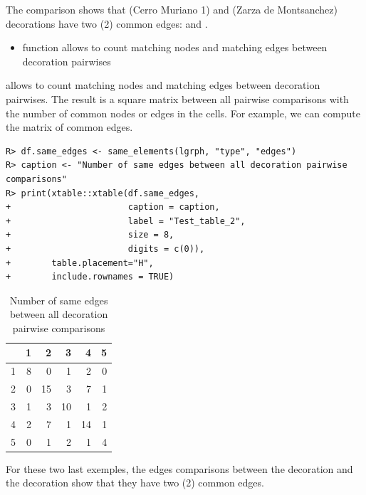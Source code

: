 \documentclass[article]{jss}\usepackage{knitr}
\begin{document}
The comparison shows that  (Cerro Muriano 1) and  (Zarza de Montsanchez) decorations have two (2) common edges:  and .

\begin{itemize}
\setlength\itemsep{.1em}
\item {} function allows to count matching nodes and matching edges between decoration pairwises
\end{itemize}

 allows to count matching nodes and matching edges between decoration pairwises. The result is a square matrix between all pairwise comparisons with the number of common nodes or edges in the cells. For example, we can compute the matrix of common edges.

\begin{kframe}
\begin{verbatim}
R> df.same_edges <- same_elements(lgrph, "type", "edges")
R> caption <- "Number of same edges between all decoration pairwise comparisons"
R> print(xtable::xtable(df.same_edges,
+                       caption = caption,
+                       label = "Test_table_2",
+                       size = 8,
+                       digits = c(0)),
+        table.placement="H",
+        include.rownames = TRUE)
\end{verbatim}
\end{kframe}%
\begin{table}[H]
\centering
\begin{tabular}{rrrrrr}
  \hline
 & 1 & 2 & 3 & 4 & 5 \\ 
  \hline
1 & 8 & 0 & 1 & 2 & 0 \\ 
  2 & 0 & 15 & 3 & 7 & 1 \\ 
  3 & 1 & 3 & 10 & 1 & 2 \\ 
  4 & 2 & 7 & 1 & 14 & 1 \\ 
  5 & 0 & 1 & 2 & 1 & 4 \\ 
   \hline
\end{tabular}
\caption{Number of same edges between all decoration pairwise comparisons} 
\label{Test_table_2}
\end{table}


For these two last exemples, the edges comparisons between the decoration  and the decoration  show that they have two (2) common edges.
\end{document}
